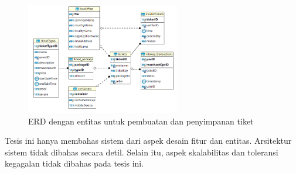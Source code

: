 \begin{figure}[htbp]
    \centering
    \includegraphics[width=0.6\textwidth]{resources/chapter-2/er-ticket-storage.png}
    \caption{ERD dengan entitas untuk pembuatan dan penyimpanan tiket \parencite{backendForTicketing}}
    \label{fig:ticket-storage}
\end{figure}

Tesis ini hanya membahas sistem dari aspek desain fitur dan entitas. Arsitektur sistem tidak dibahas secara detil. Selain itu, aspek skalabilitas dan toleransi kegagalan tidak dibahas pada tesis ini.